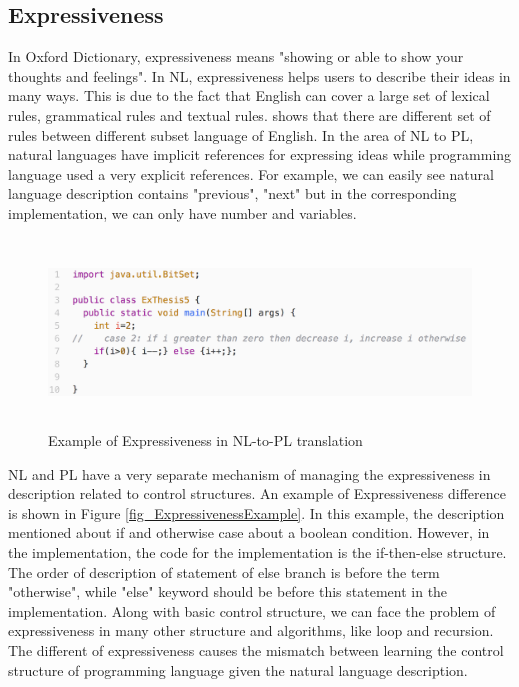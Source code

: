 \subsection{Expressiveness}
In Oxford Dictionary, expressiveness means "showing or able to show your thoughts and feelings". In NL, expressiveness helps users to describe their ideas in many ways.  This is due to the fact that English can cover a large set of lexical rules, grammatical rules and textual rules. \cite{Pulido-Prieto:2017:SNP:3145473.3109481} shows that there are different set of rules between different subset language of English. In the area of NL to PL, natural languages have implicit references for expressing ideas while programming language used a very explicit references. For example, we can easily see natural language description contains "previous", "next" but in the corresponding implementation, we can only have number and variables. \\
\begin{figure}[htp]
	\centering
	\includegraphics[width=14cm,height=5cm]{resources/fig_expressiveness_example.png}%
	\caption[Example of Expressiveness in NL-to-PL translation]{Example of Expressiveness in NL-to-PL translation} 
	\label{fig:ExpressivenessExample}
\end{figure}
NL and PL have a very separate mechanism of managing the expressiveness in description related to control structures. An example of Expressiveness difference is shown in Figure \ref{fig_ExpressivenessExample}. In this example, the description mentioned about if and otherwise case about a boolean condition. However, in the implementation, the code for the implementation is the if-then-else structure. The order of description of statement of else branch is before the term "otherwise", while "else" keyword should be before this statement in the implementation. Along with basic control structure, we can face the problem of expressiveness in many other structure and algorithms, like loop and recursion. The different of expressiveness causes the mismatch between learning the control structure of programming language given the natural language description. 

